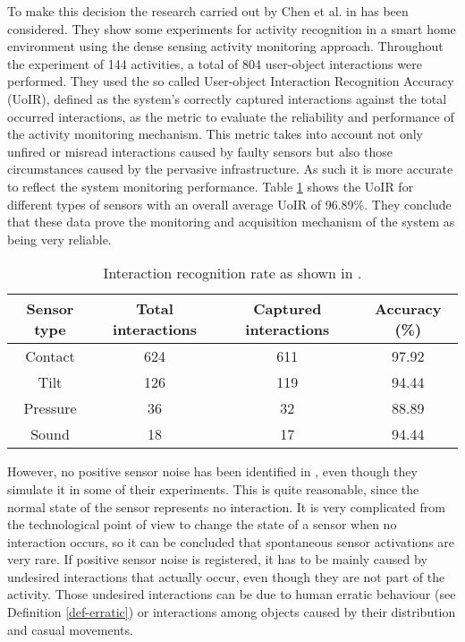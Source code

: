 To make this decision the research carried out by Chen et al. in \cite{Chen2012a} has been considered. They show some experiments for activity recognition in a smart home environment using the dense sensing activity monitoring approach. Throughout the experiment of 144 activities, a total of 804 user-object interactions were performed. They used the so called User-object Interaction Recognition Accuracy (UoIR), defined as the system’s correctly captured interactions against the total occurred interactions, as the metric to evaluate the reliability and performance of the activity monitoring mechanism. This metric takes into account not only unfired or misread interactions caused by faulty sensors but also those circumstances caused by the pervasive infrastructure. As such it is more accurate to reflect the system monitoring performance. Table \ref{tab-sensor-errors} shows the UoIR for different types of sensors with an overall average UoIR of 96.89\%. They conclude that these data prove the monitoring and acquisition mechanism of the system as being very reliable.

\begin{table}[htbp]\scriptsize
\begin{center}
 \begin{tabular}{cccc}
  \hline
  Sensor type & Total interactions & Captured interactions & Accuracy (\%) \\
  \hline
  Contact & 624 & 611 & 97.92 \\
  Tilt & 126 & 119 & 94.44 \\
  Pressure & 36 & 32 & 88.89 \\
  Sound & 18 & 17 & 94.44 \\
  \hline
 \end{tabular}
 \caption{Interaction recognition rate as shown in \cite{Chen2012a}.}
 \label{tab-sensor-errors}
\end{center} 
\end{table}

However, no positive sensor noise has been identified in \cite{Chen2012a}, even though they simulate it in some of their experiments. This is quite reasonable, since the normal state of the sensor represents no interaction. It is very complicated from the technological point of view to change the state of a sensor when no interaction occurs, so it can be concluded that spontaneous sensor activations are very rare. If positive sensor noise is registered, it has to be mainly caused by undesired interactions that actually occur, even though they are not part of the activity. Those undesired interactions can be due to human erratic behaviour (see Definition \ref{def-erratic}) or interactions among objects caused by their distribution and casual movements. 

